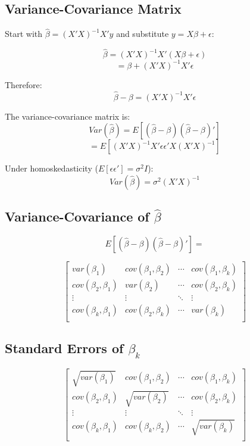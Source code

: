 \documentclass[
  letterpaper,
  DIV=11,
  numbers=noendperiod]{scrartcl}
\begin{document}
\subsection{Variance-Covariance
Matrix}\label{variance-covariance-matrix}

Start with \(\hat{\beta} = (X'X)^{-1}X'y\) and substitute
\(y = X\beta + \epsilon\):

\[\hat{\beta} = (X'X)^{-1}X'(X\beta + \epsilon)\]
\[= \beta + (X'X)^{-1}X'\epsilon\]

Therefore: \[\hat{\beta} - \beta = (X'X)^{-1}X'\epsilon\]

The variance-covariance matrix is:
\[Var(\hat{\beta}) = E[(\hat{\beta} - \beta)(\hat{\beta} - \beta)']\]
\[= E[(X'X)^{-1}X'\epsilon\epsilon'X(X'X)^{-1}]\]

Under homoskedasticity (\(E[\epsilon\epsilon'] = \sigma^2I\)):
\[Var(\hat{\beta}) = \sigma^2(X'X)^{-1}\]

\subsection{\texorpdfstring{Variance-Covariance of
\(\widehat{\beta}\)}{Variance-Covariance of \textbackslash widehat\{\textbackslash beta\}}}\label{variance-covariance-of-widehatbeta}

\[ E[(\widehat{\beta}-\beta)(\widehat{\beta}-\beta)'] = \] \(~\)

\[\left[
\begin{array}{cccc}
var(\beta_1) & cov(\beta_1,\beta_2) &\cdots &cov(\beta_1,\beta_k)\\
cov(\beta_2,\beta_1)& var(\beta_2) &\cdots &cov(\beta_2,\beta_k)\\
\vdots&\vdots&\ddots& \vdots\\
cov(\beta_k,\beta_1) &cov(\beta_2,\beta_k) &\cdots & var(\beta_k)\\
\end{array} \right] \]

\subsection{\texorpdfstring{Standard Errors of
\(\beta_k\)}{Standard Errors of \textbackslash beta\_k}}\label{standard-errors-of-beta_k}

\[
\left[
\begin{array}{cccc}
\sqrt{var(\beta_1)} & cov(\beta_1,\beta_2) &\cdots &cov(\beta_1,\beta_k)\\
cov(\beta_2,\beta_1)& \sqrt{var(\beta_2)} &\cdots &cov(\beta_2,\beta_k)\\
\vdots&\vdots&\ddots& \vdots\\
cov(\beta_k,\beta_1) &cov(\beta_k,\beta_2) &\cdots & \sqrt{var(\beta_k)}\\
\end{array} \right] 
\]
\end{document}

